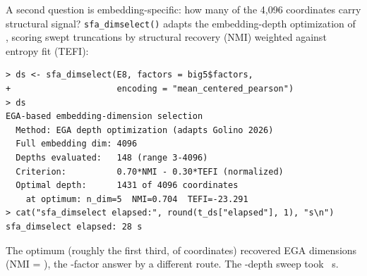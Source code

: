 A second question is embedding-specific: how many of the 4{,}096
coordinates carry structural signal? \texttt{sfa\_dimselect()} adapts
the embedding-depth optimization of \citet{golino-2026}, scoring swept
truncations by structural recovery (NMI) weighted against entropy fit
(TEFI):

{\scriptsize
\begin{verbatim}
> ds <- sfa_dimselect(E8, factors = big5$factors,
+                     encoding = "mean_centered_pearson")
> ds
EGA-based embedding-dimension selection
  Method: EGA depth optimization (adapts Golino 2026)
  Full embedding dim: 4096
  Depths evaluated:   148 (range 3-4096)
  Criterion:          0.70*NMI - 0.30*TEFI (normalized)
  Optimal depth:      1431 of 4096 coordinates
    at optimum: n_dim=5  NMI=0.704  TEFI=-23.291
> cat("sfa_dimselect elapsed:", round(t_ds["elapsed"], 1), "s\n")
sfa_dimselect elapsed: 28 s
\end{verbatim}
}

The optimum (roughly the first third, \valDepthOpt{} of \valDepthFull
coordinates) recovered \valDepthNDimWord{} EGA dimensions (NMI = \valDepthNmi), the
\valDepthNDimWord-factor answer by a different route. The \valDepthEval-depth sweep took
\valTimeDimselect~s.
